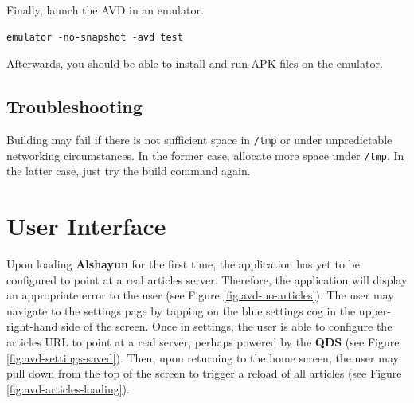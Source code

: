 \documentclass[12pt]{report}
\begin{document}
Finally, launch the AVD in an emulator.

\begin{verbatim}
emulator -no-snapshot -avd test
\end{verbatim}

Afterwards, you should be able to install and run APK files on the emulator.

        \subsection{Troubleshooting}

Building may fail if there is not sufficient space in \texttt{/tmp} or under
unpredictable networking circumstances. In the former case, allocate more space
under \texttt{/tmp}. In the latter case, just try the build command again.

    \section{User Interface}

Upon loading \textbf{Alshayun} for the first time, the application has yet to be
configured to point at a real articles server. Therefore, the application will
display an appropriate error to the user (see Figure \ref{fig:avd-no-articles}).
The user may navigate to the settings page by tapping on the blue settings cog
in the upper-right-hand side of the screen. Once in settings, the user is able
to configure the articles URL to point at a real server, perhaps powered by the
\textbf{QDS} (see Figure \ref{fig:avd-settings-saved}). Then, upon returning to
the home screen, the user may pull down from the top of the screen to trigger a
reload of all articles (see Figure \ref{fig:avd-articles-loading}).
\end{document}
